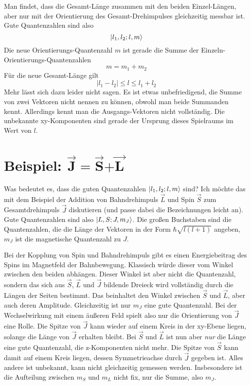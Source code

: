 Man findet, dass die Gesamt-Länge zusammen mit den beiden Einzel-Längen, aber nur mit der Orientierung des Gesamt-Drehimpulses gleichzeitig messbar ist. Gute Quantenzahlen sind also 
\begin{equation}
\ket{l_1, l_2; l , m }
\end{equation} 
Die neue Orientierungs-Quantenzahl $m$ ist gerade die Summe der Einzeln-Orientierungs-Quantenzahlen
\begin{equation}
 m  = m_1 + m_2
\end{equation}
Für die  neue Gesamt-Länge gilt
\begin{equation}
 | l_1 - l_2 | \le l \le l_1 + l_2
\end{equation}
Mehr lässt sich dazu leider nicht sagen. Es ist etwas unbefriedigend, die Summe von zwei Vektoren nicht nennen zu können, obwohl man beide Summanden kennt. Allerdings kennt man die Ausgangs-Vektoren nicht vollständig. Die unbekannte xy-Komponenten sind gerade der Ursprung dieses Spielraums im Wert von $l$.


\section{Beispiel: $\vec{\mathbf{J}} \mathbf{=} \vec{\mathbf{S}} \mathbf{+}  \vec{\mathbf{L}} $}

Was bedeutet es, dass die guten Quantenzahlen $\ket{l_1, l_2; l , m }$ sind? Ich möchte das mit dem  Beispiel der Addition von Bahndrehimpuls $\vec{L}$ und Spin $\vec{S}$ zum Gesamtdrehimpuls $\vec{J}$ diskutieren (und passe dabei die Bezeichnungen leicht an). Gute Quantenzahlen sind also $\ket{L, S; J , m_J }$. Die großen Buchstaben sind die Quantenzahlen, die die Länge der Vektoren in der Form $\hbar \sqrt{l (l+1)}$ angeben, $m_J$ ist die magnetische Quantenzahl zu $J$.


Bei der Kopplung von Spin und Bahndrehimpuls gibt es einen Energiebeitrag des Spins im Magnetfeld der Bahnbewegung. Klassisch würde dieser vom Winkel zwischen den beiden abhängen. Dieser Winkel ist aber nicht die Quantenzahl, sondern das sich aus $\vec{S}$, $\vec{L}$ und $\vec{J}$ bildende Dreieck wird vollständig durch die Längen der Seiten bestimmt. Das beinhaltet den Winkel zwischen $\vec{S}$ und $\vec{L}$, aber auch deren Amplitude. Gleichzeitig ist nur $m_J$ eine gute Quantenzahl. Bei der Wechselwirkung mit einem äußeren Feld spielt also nur die Orientierung von $\vec{J}$ eine Rolle. Die Spitze von $\vec{J}$ kann wieder auf einem Kreis in der xy-Ebene liegen, solange die Länge von $\vec{J}$ erhalten bleibt. Bei $\vec{S}$ und $\vec{L}$ ist nun aber \emph{nur} die Länge eine gute Quantenzahl, die z-Komponenten nicht mehr. Die Spitze von $\vec{S}$ kann damit auf einem Kreis liegen, dessen Symmetrieachse durch $\vec{J}$ gegeben ist. Alles andere ist unbekannt, kann nicht gleichzeitig gemessen werden. Insbesondere ist die Aufteilung zwischen $m_S$ und $m_L$ nicht fix, nur die Summe, also $m_J$.

